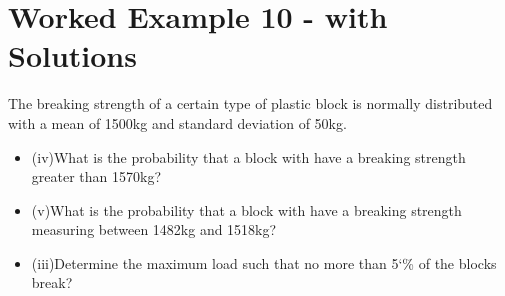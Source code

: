 \section{Worked Example 10 - with Solutions}

The breaking strength of a certain type of plastic block is normally distributed with a
mean of 1500kg and standard deviation of 50kg. 

\begin{itemize}
\item (iv)What is the probability that a block with have a breaking strength greater than 1570kg?
\item (v)What is the probability that a block with have a breaking strength measuring between 1482kg and 1518kg?
\item (iii)Determine the maximum load such that no more than 5`\% of the blocks break?
\end{itemize}
